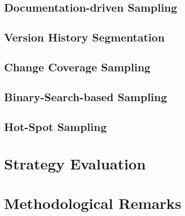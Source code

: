 \subsection{Documentation-driven Sampling}
\subsection{Version History Segmentation}
\subsection{Change Coverage Sampling}
\subsection{Binary-Search-based Sampling}
\subsection{Hot-Spot Sampling}

\section{Strategy Evaluation}\label{sec:revsampling_eval}
\section{Methodological Remarks}\label{sec:revsampling_method}


